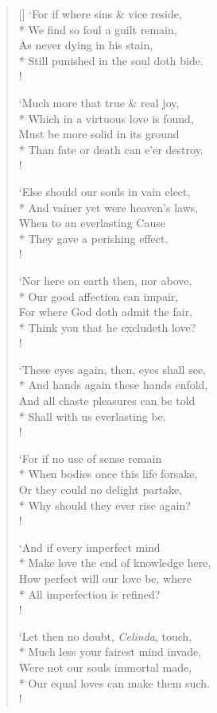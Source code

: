 \documentclass[MAIN]{subfiles}
\begin{document}
\begin{verse}[\versewidth]
`For if where sins \& vice reside,\\*
\vin We find so foul a guilt remain,\\
\vin As never dying in his stain,\\*
Still punished in the soul doth bide.\\!

`Much more that true \& real joy,\\*
\vin Which in a virtuous love is found,\\
\vin Must be more solid in its ground\\*
Than fate or death can e'er destroy.\\!

`Else should our souls in vain elect,\\*
\vin And vainer yet were heaven's laws,\\
\vin When to an everlasting Cause\\*
They gave a perishing effect.\\!

`Nor here on earth then, nor above,\\*
\vin Our good affection can impair,\\
\vin For where God doth admit the fair,\\*
Think you that he excludeth love?\\!

`These eyes again, then, eyes shall see,\\*
\vin And hands again these hands enfold,\\
\vin And all chaste pleasures can be told\\*
Shall with us everlasting be.\\!

`For if no use of sense remain\\*
\vin When bodies once this life forsake,\\
\vin Or they could no delight partake,\\*
Why should they ever rise again?\\!

`And if every imperfect mind\\*
\vin Make love the end of knowledge here,\\
\vin How perfect will our love be, where\\*
All imperfection is refined?\\! 

`Let then no doubt, \emph{Celinda}, touch,\\*
\vin Much less your fairest mind invade,\\
\vin Were not our souls immortal made,\\*
Our equal loves can make them such.\\!


\end{verse}
\end{document}
